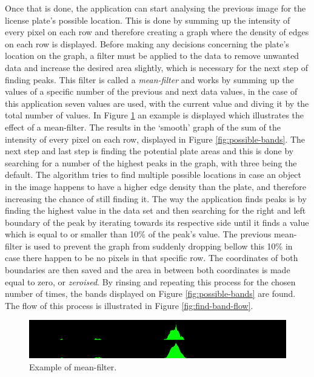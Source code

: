 Once that is done, the application can start analysing the previous image for the license plate's possible location. This is done by summing up the intensity of every pixel on each row and therefore creating a graph where the density of edges on each row is displayed. Before making any decisions concerning the plate's location on the graph, a filter must be applied to the data to remove unwanted data and increase the desired area slightly, which is necessary for the next step of finding peaks. This filter is called a \emph{mean-filter} and works by summing up the values of a specific number of the previous and next data values, in the case of this application seven values are used, with the current value and diving it by the total number of values. In Figure \ref{fig:mean-filter} an example is displayed which illustrates the effect of a mean-filter. The results in the `smooth' graph of the sum of the intensity of every pixel on each row, displayed in Figure \ref{fig:possible-bands}. The next step and last step is finding the potential plate areas and this is done by searching for a number of the highest peaks in the graph, with three being the default. The algorithm tries to find multiple possible locations in case an object in the image happens to have a higher edge density than the plate, and therefore increasing the chance of still finding it. The way the application finds peaks is by finding the highest value in the data set and then searching for the right and left boundary of the peak by iterating towards its respective side until it finds a value which is equal to or smaller than 10\% of the peak's value. The previous mean-filter is used to prevent the graph from suddenly dropping bellow this 10\% in case there happen to be no pixels in that specific row. The coordinates of both boundaries are then saved and the area in between both coordinates is made equal to zero, or \emph{zeroised}. By rinsing and repeating this process for the chosen number of times, the bands displayed on Figure \ref{fig:possible-bands} are found. The flow of this process is illustrated in Figure \ref{fig:find-band-flow}.

\begin{figure}[ht]
    \centering
    \includegraphics[width=\textwidth]{plaatjes/mean-filter}
    \caption{Example of mean-filter.}
    \label{fig:mean-filter}
\end{figure}

